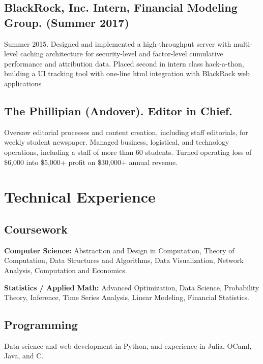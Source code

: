 \documentclass[letterpaper]{amsart}
\renewenvironment{itemize}{
  \begin{list}{}{
    \setlength{\leftmargin}{1.5em}
  }
}{
  \end{list}
}
\begin{document}
\subsection*{BlackRock, Inc. Intern, Financial Modeling Group. (Summer 2017)}
\begin{itemize}
\item Summer 2015. Designed and implemented a high-throughput server with multi-level caching architecture for security-level
and factor-level cumulative performance and attribution data. Placed second in intern class hack-a-thon,
building a UI tracking tool with one-line html integration with BlackRock web applications
\end{itemize}

\subsection*{The Phillipian (Andover). Editor in Chief.}
\begin{itemize}
\item Oversaw editorial processes and content creation, including staff editorials, for weekly student newspaper. Managed business,
logistical, and technology operations, including a staff of more than 60 students. Turned operating loss
of \$6,000 into \$5,000+ profit on \$30,000+ annual revenue.
\end{itemize}


\section*{Technical Experience}
\subsection*{Coursework}
\begin{itemize}
\item \textbf{Computer Science:} Abstraction and Design in Computation, Theory of Computation, Data Structures and Algorithms, Data Visualization, Network Analysis, Computation and Economics.
\item  \textbf{Statistics / Applied Math:} Advanced Optimization, Data Science, Probability Theory, Inference, Time Series Analysis, Linear Modeling, Financial Statistics.  
\end{itemize}

\subsection*{Programming}
\begin{itemize} 
\item Data science and web development in Python, and experience in Julia, OCaml, Java, and C.
\end{itemize}
\end{document}
